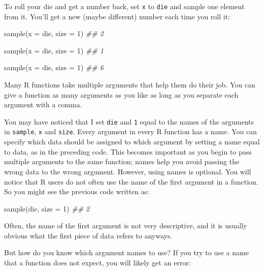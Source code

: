 \documentclass[
  letterpaper,
  DIV=11,
  numbers=noendperiod]{scrbook}
\newenvironment{Shaded}{\begin{snugshade}}{\end{snugshade}}
\newcommand{\AttributeTok}[1]{\textcolor[rgb]{0.40,0.45,0.13}{#1}}
\newcommand{\DecValTok}[1]{\textcolor[rgb]{0.68,0.00,0.00}{#1}}
\newcommand{\DocumentationTok}[1]{\textcolor[rgb]{0.37,0.37,0.37}{\textit{#1}}}
\newcommand{\FunctionTok}[1]{\textcolor[rgb]{0.28,0.35,0.67}{#1}}
\newcommand{\NormalTok}[1]{\textcolor[rgb]{0.00,0.23,0.31}{#1}}
\begin{document}
To roll your die and get a number back, set \texttt{x} to \texttt{die}
and sample one element from it. You'll get a new (maybe different)
number each time you roll it:

\begin{Shaded}
\begin{Highlighting}[]
\FunctionTok{sample}\NormalTok{(}\AttributeTok{x =}\NormalTok{ die, }\AttributeTok{size =} \DecValTok{1}\NormalTok{)}
\DocumentationTok{\#\# 2}

\FunctionTok{sample}\NormalTok{(}\AttributeTok{x =}\NormalTok{ die, }\AttributeTok{size =} \DecValTok{1}\NormalTok{)}
\DocumentationTok{\#\# 1}

\FunctionTok{sample}\NormalTok{(}\AttributeTok{x =}\NormalTok{ die, }\AttributeTok{size =} \DecValTok{1}\NormalTok{)}
\DocumentationTok{\#\# 6}
\end{Highlighting}
\end{Shaded}

Many R functions take multiple arguments that help them do their job.
You can give a function as many arguments as you like as long as you
separate each argument with a comma.

You may have noticed that I set \texttt{die} and \texttt{1} equal to the
names of the arguments in \texttt{sample}, \texttt{x} and \texttt{size}.
Every argument in every R function has a name. You can specify which
data should be assigned to which argument by setting a name equal to
data, as in the preceding code. This becomes important as you begin to
pass multiple arguments to the same function; names help you avoid
passing the wrong data to the wrong argument. However, using names is
optional. You will notice that R users do not often use the name of the
first argument in a function. So you might see the previous code written
as:

\begin{Shaded}
\begin{Highlighting}[]
\FunctionTok{sample}\NormalTok{(die, }\AttributeTok{size =} \DecValTok{1}\NormalTok{)}
\DocumentationTok{\#\# 2}
\end{Highlighting}
\end{Shaded}

Often, the name of the first argument is not very descriptive, and it is
usually obvious what the first piece of data refers to anyways.

But how do you know which argument names to use? If you try to use a
name that a function does not expect, you will likely get an error:
\end{document}
